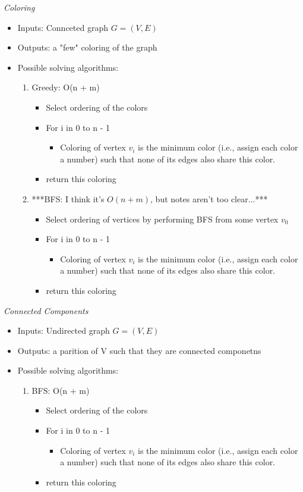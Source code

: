 \documentclass{article}
\begin{document}
\emph{Coloring}
\begin{itemize}
  \item Inputs: Connceted graph $G = (V,E)$
  \item Outputs: a "few" coloring of the graph
  \item Possible solving algorithms:
  \begin{enumerate}
    \item Greedy: O(n + m)
    \begin{itemize}
      \item Select ordering of the colors
      \item For i in 0 to n - 1
      \begin{itemize}
        \item Coloring of vertex $v_{i}$ is the minimum color (i.e., assign each color a number) such that
        none of its edges also share this color.
      \end{itemize}
      \item return this coloring
    \end{itemize}
    \item ***BFS: I think it's $O(n + m)$, but notes aren't too clear...***
    \begin{itemize}
      \item Select ordering of vertices by performing BFS from some vertex $v_{0}$
      \item For i in 0 to n - 1
      \begin{itemize}
        \item Coloring of vertex $v_{i}$ is the minimum color (i.e., assign each color a number) such that
        none of its edges also share this color.
      \end{itemize}
      \item return this coloring
    \end{itemize}
  \end{enumerate}
\end{itemize}

\emph{Connected Components}
\begin{itemize}
  \item Inputs: Undirected graph $G = (V,E)$
  \item Outputs: a parition of V such that they are connected componetns
  \item Possible solving algorithms:
  \begin{enumerate}
    \item BFS: O(n + m)
    \begin{itemize}
      \item Select ordering of the colors
      \item For i in 0 to n - 1
      \begin{itemize}
        \item Coloring of vertex $v_{i}$ is the minimum color (i.e., assign each color a number) such that
        none of its edges also share this color.
      \end{itemize}
      \item return this coloring
    \end{itemize}
  \end{enumerate}
\end{itemize}
\end{document}
